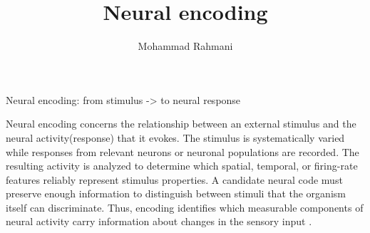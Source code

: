 \documentclass[a4paper]{article}
\title{Neural encoding}
\date{}
\author{Mohammad Rahmani}
\begin{document}
    \maketitle
    Neural encoding: from stimulus -> to neural response
    
    Neural encoding concerns the relationship between an external stimulus and the neural activity(response) that it evokes. The stimulus is systematically varied while responses from relevant neurons or neuronal populations are recorded. The resulting activity is analyzed to determine which spatial, temporal, or firing-rate features reliably represent stimulus properties. A candidate neural code must preserve enough information to distinguish between stimuli that the organism itself can discriminate. Thus, encoding identifies which measurable components of neural activity carry information about changes in the sensory input .
    
    
\end{document}
